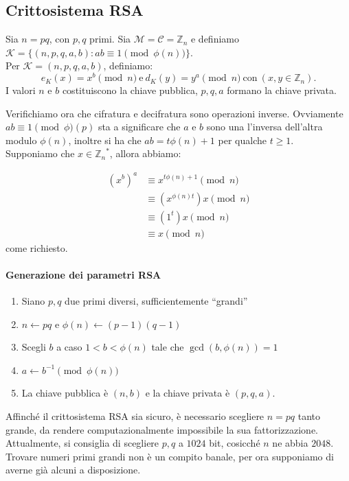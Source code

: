 \subsection{Crittosistema RSA} Sia $n=pq$, con $p,q$ primi. Sia $\mathcal{M}=\mathcal{C}=\mathbb{Z}_n$ e definiamo $\mathcal{K}=\{(n,p,q,a,b) : ab \equiv 1 \pmod {\phi(n)}\}$. \\ Per $\mathcal{K}=(n,p,q,a,b)$, definiamo: 
\[
e_K(x)=x^b \pmod n \ \text{e} \ d_K(y)=y^a \pmod n \ \text{con} \ (x,y \in \mathbb{Z}_n). 
\]
I valori $n$ e $b$ costituiscono la chiave pubblica, $p,q, a$ formano la chiave privata. 


\vspace{0.2cm} \noindent Verifichiamo ora che cifratura e decifratura sono operazioni inverse. Ovviamente $ ab \equiv 1 \pmod \phi(p)$ sta a significare che $a$ e $b$ sono una l'inversa dell'altra modulo $\phi(n)$, inoltre si ha che $ab =  {t \phi(n)} +1$ per qualche $t \geq 1$. \\ Supponiamo che $x \in {\mathbb{Z}_n}^*$, allora abbiamo: 

\begin{align*}
    (x^b)^a &\equiv x^{t\phi(n)+1} \pmod n \\
    &\equiv (x^{\phi(n)t})x \pmod n \\
    &\equiv (1^t)x \pmod n \\
    &\equiv x \pmod n 
\end{align*} come richiesto. 



\paragraph{Generazione dei parametri RSA} 
    \begin{enumerate}
        \item Siano $p,q$ due primi diversi, sufficientemente ``grandi''
        \item $n \gets pq$ e $\phi(n) \gets (p-1)(q-1)$
        \item Scegli $b$ a caso $1<b<\phi(n)$ tale che $\gcd(b,\phi(n))=1$
        \item $a \gets b^{-1} \pmod {\phi(n)}$
        \item La chiave pubblica è $(n,b)$ e la chiave privata è $(p,q,a)$.  
    \end{enumerate}

    Affinché il crittosistema RSA sia sicuro, è necessario scegliere $n=pq$ tanto grande, da rendere computazionalmente impossibile la sua fattorizzazione. Attualmente, si consiglia di scegliere $p,q$ a $1024$ bit, cosicché $n$ ne abbia $2048$. Trovare numeri primi grandi non è un compito banale, per ora supponiamo di averne già alcuni a disposizione.
    
